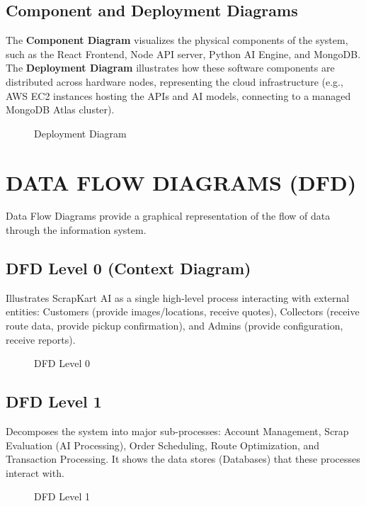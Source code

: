 \subsection{Component and Deployment Diagrams}
The \textbf{Component Diagram} visualizes the physical components of the system, such as the React Frontend, Node API server, Python AI Engine, and MongoDB. The \textbf{Deployment Diagram} illustrates how these software components are distributed across hardware nodes, representing the cloud infrastructure (e.g., AWS EC2 instances hosting the APIs and AI models, connecting to a managed MongoDB Atlas cluster).
\begin{figure}[H]
    \centering
    \vspace{5cm}
    \caption{Deployment Diagram}
    \label{fig:deployment_diagram}
\end{figure}

\section{DATA FLOW DIAGRAMS (DFD)}
Data Flow Diagrams provide a graphical representation of the flow of data through the information system.

\subsection{DFD Level 0 (Context Diagram)}
Illustrates ScrapKart AI as a single high-level process interacting with external entities: Customers (provide images/locations, receive quotes), Collectors (receive route data, provide pickup confirmation), and Admins (provide configuration, receive reports).
\begin{figure}[H]
    \centering
    \vspace{5cm}
    \caption{DFD Level 0}
    \label{fig:dfd_0}
\end{figure}

\subsection{DFD Level 1}
Decomposes the system into major sub-processes: Account Management, Scrap Evaluation (AI Processing), Order Scheduling, Route Optimization, and Transaction Processing. It shows the data stores (Databases) that these processes interact with.
\begin{figure}[H]
    \centering
    \vspace{5cm}
    \caption{DFD Level 1}
    \label{fig:dfd_1}
\end{figure}

